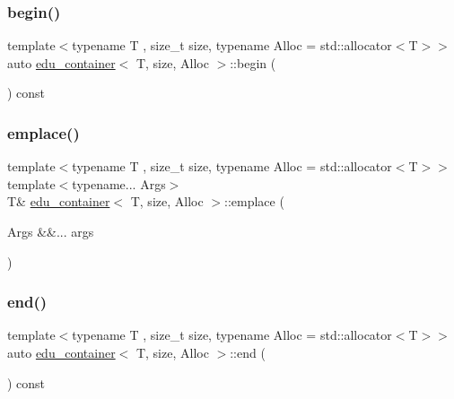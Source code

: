 \subsubsection{\texorpdfstring{begin()}{begin()}}
{\footnotesize\ttfamily template$<$typename T , size\+\_\+t size, typename Alloc  = std\+::allocator$<$\+T$>$$>$ \\
auto \hyperlink{classedu__container}{edu\+\_\+container}$<$ T, size, Alloc $>$\+::begin (\begin{DoxyParamCaption}{ }\end{DoxyParamCaption}) const\hspace{0.3cm}{\ttfamily [inline]}}

\mbox{\label{classedu__container_a0c79c6d4ab2752c1edee74c591659eec}} 
\subsubsection{\texorpdfstring{emplace()}{emplace()}}
{\footnotesize\ttfamily template$<$typename T , size\+\_\+t size, typename Alloc  = std\+::allocator$<$\+T$>$$>$ \\
template$<$typename... Args$>$ \\
T\& \hyperlink{classedu__container}{edu\+\_\+container}$<$ T, size, Alloc $>$\+::emplace (\begin{DoxyParamCaption}\item[{Args \&\&...}]{args }\end{DoxyParamCaption})\hspace{0.3cm}{\ttfamily [inline]}}

\mbox{\label{classedu__container_aa32c0fa70c685557a5d35fe48a8fa1c2}} 
\subsubsection{\texorpdfstring{end()}{end()}}
{\footnotesize\ttfamily template$<$typename T , size\+\_\+t size, typename Alloc  = std\+::allocator$<$\+T$>$$>$ \\
auto \hyperlink{classedu__container}{edu\+\_\+container}$<$ T, size, Alloc $>$\+::end (\begin{DoxyParamCaption}{ }\end{DoxyParamCaption}) const\hspace{0.3cm}{\ttfamily [inline]}}


